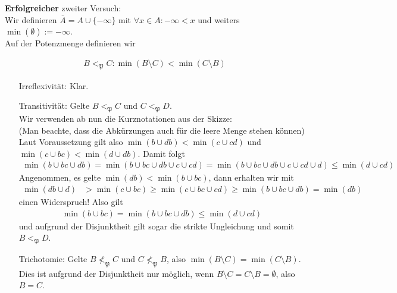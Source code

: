 \begin{solution}
\textbf{Erfolgreicher} zweiter Versuch: \\
Wir definieren $\overline{A} = A \cup \{-\infty\}$ mit $\forall x \in A: -\infty < x$
und weiters $\min(\emptyset) := -\infty$. \\
Auf der Potenzmenge definieren wir

\begin{align*}
  B <_\mathfrak{P} C :\min(B \setminus C) < \min(C \setminus B)
\end{align*}


\begin{center}
\def\r{1}
\def\R{1.3}
\end{center}

\begin{itemize}
  \item[Irreflexivität:] Klar.
  \item[Transitivität:] Gelte $B <_\mathfrak{P} C$ und $C <_\mathfrak{P} D$. \\
  Wir verwenden ab nun die Kurznotationen aus der Skizze: \\
  (Man beachte, dass die Abkürzungen auch für die leere Menge stehen können)\\
  Laut Voraussetzung gilt also $\min(b \cup db) < \min(c \cup cd)$ und
  $\min(c \cup bc) < \min(d \cup db)$. Damit folgt
  \begin{align*}
    \min(b \cup bc \cup db) = \min(b \cup bc \cup db \cup c \cup cd)
    = \min(b \cup bc \cup db \cup c \cup cd \cup d) \leq \min(d \cup cd)
  \end{align*}
  Angenommen, es gelte $\min(db) < \min(b \cup bc)$, dann erhalten wir mit
  \begin{align*}
  \min(db \cup d) &> \min(c \cup bc) \geq \min(c \cup bc \cup cd) \geq \min(b \cup bc \cup db)
  = \min(db)
  \end{align*}
  einen Widerspruch! Also gilt
  \begin{align*}
    \min(b \cup bc) = \min(b \cup bc \cup db) \leq \min(d \cup cd)
  \end{align*}
  und aufgrund der Disjunktheit gilt sogar die strikte Ungleichung und somit $B <_\mathfrak{P} D$.

  \item[Trichotomie:] Gelte $B \nless_\mathfrak{P} C$ und $C \nless_\mathfrak{P} B$, also
  $\min(B \setminus C) = \min(C \setminus B)$. Dies ist aufgrund der Disjunktheit nur
  möglich, wenn $B \setminus C = C \setminus B = \emptyset$, also $B = C$.
\end{itemize}

\end{solution}

